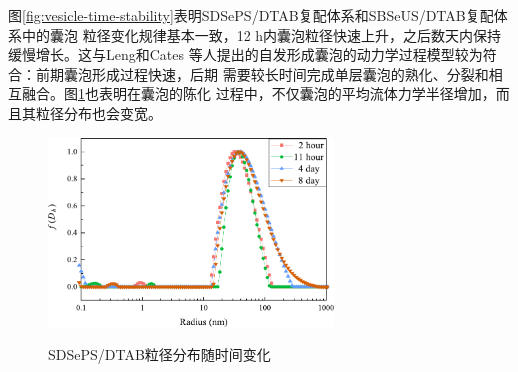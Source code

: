 \documentclass[bachelor,winfonts,replaceperiod]{jnuthesis}
\begin{document}
    图\ref{fig:vesicle-time-stability}表明SDSePS/DTAB复配体系和SBSeUS/DTAB复配体系中的囊泡
    粒径变化规律基本一致，12 h内囊泡粒径快速上升，之后数天内保持缓慢增长。这与Leng和Cates
    等人提出的自发形成囊泡的动力学过程模型\cite{刘洪国2016}较为符合：前期囊泡形成过程快速，后期
    需要较长时间完成单层囊泡的熟化、分裂和相互融合。图\ref{fig:vesicle-radius}也表明在囊泡的陈化
    过程中，不仅囊泡的平均流体力学半径增加，而且其粒径分布也会变宽。
    \begin{figure}[htbp]
        \centering
        \includegraphics[width=0.675\textwidth]{figure/vesicle-radius.pdf}\\
        \caption{SDSePS/DTAB粒径分布随时间变化}\label{fig:vesicle-radius}
    \end{figure}
\end{document}
